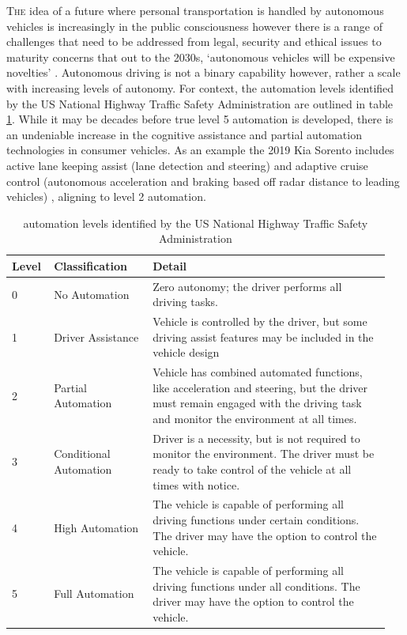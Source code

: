 \documentclass[]{aiaa-tc}%
\begin{document}
\lettrine[nindent=0pt]{T}{he} idea of a future where personal transportation is handled by autonomous vehicles is increasingly in the public consciousness however there is a range of challenges that need to be addressed from legal, security and ethical issues \citep{gmReport} to maturity concerns that out to the 2030s, `autonomous vehicles will be expensive novelties' \citep{vicTransportImplications}. Autonomous driving is not a binary capability however, rather a scale with increasing levels of autonomy. For context, the automation levels identified by the US National Highway Traffic Safety Administration \citep{automationVisionForSafety} are outlined in table \ref{t:automationLevels}. While it may be decades before true level 5 automation is developed, there is an undeniable increase in the cognitive assistance and partial automation technologies in consumer vehicles. As an example the 2019 Kia Sorento includes active lane keeping assist (lane detection and steering) and adaptive cruise control (autonomous acceleration and braking based off radar distance to leading vehicles) \citep{kia}, aligning to level 2 automation. 


\begin{table}
 \begin{center}
  \caption{automation levels identified by the US National Highway Traffic Safety Administration \citep{automationVisionForSafety}}
  \label{t:automationLevels}
  \begin{tabular}{p{0.1\linewidth}p{0.25\linewidth}p{0.6\linewidth}}
       Level & Classification & Detail\\\hline
        0 &  No Automation & Zero autonomy; the driver performs all driving tasks. \\
       1 &  Driver Assistance & Vehicle is controlled by the driver, but some driving assist features may be included in the vehicle design \\
       2 &  Partial Automation & Vehicle has combined automated functions, like acceleration and steering, but the driver must remain engaged with the driving task and monitor the environment at all times. \\
       3 &  Conditional Automation &   Driver is a necessity, but is not required to monitor the environment. The driver must be ready to take control of the vehicle at all times with notice. \\
      4 &  High Automation &   The vehicle is capable of performing all driving functions under certain conditions. The driver may have the option to control the vehicle. \\
      5 &   Full Automation &   The vehicle is capable of performing all driving functions under all conditions. The driver may have the option to control the vehicle. 
  \end{tabular}
 \end{center}
\end{table}
\end{document}
